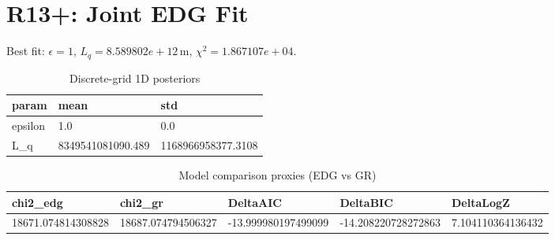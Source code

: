 \section{R13+: Joint EDG Fit}
Best fit: $\epsilon = 1$, $L_q = 8.589802e+12\,\mathrm{m}$, $\chi^2 = 1.867107e+04$.
\begin{table}[h!]
\centering
\caption{Discrete-grid 1D posteriors}
\label{tab:r13p_marg}
\begin{tabular}{l | l | l}
\hline
param & mean & std \\
\hline
epsilon & 1.0 & 0.0 \\
L_q & 8349541081090.489 & 1168966958377.3108 \\
\hline
\end{tabular}
\end{table}

\begin{table}[h!]
\centering
\caption{Model comparison proxies (EDG vs GR)}
\label{tab:r13p_model}
\begin{tabular}{l | l | l | l | l}
\hline
chi2_edg & chi2_gr & DeltaAIC & DeltaBIC & DeltaLogZ \\
\hline
18671.074814308828 & 18687.074794506327 & -13.999980197499099 & -14.208220728272863 & 7.104110364136432 \\
\hline
\end{tabular}
\end{table}

